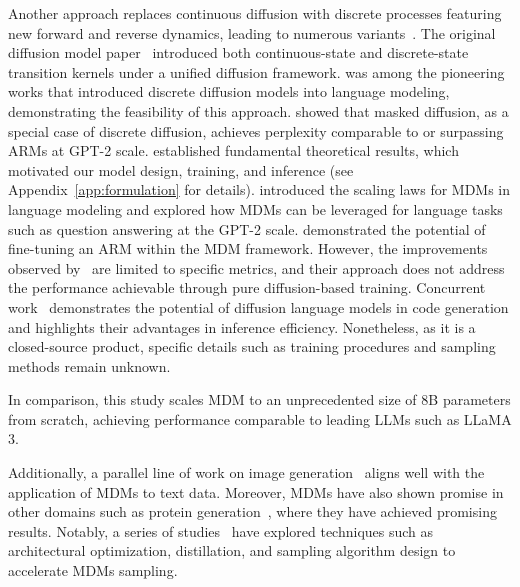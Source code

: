 \documentclass{article}
\begin{document}
Another approach replaces continuous diffusion with discrete processes featuring new forward and reverse dynamics, leading to numerous variants~\citep{hoogeboom2021argmax,hoogeboom2021autoregressive,he2022diffusionbert,campbell2022continuous,meng2022concrete,reid2022diffuser,sun2022score,kitouni2023disk,Zheng2023ARD,chen2023fast,ye2023diffusion,gat2024discrete,zheng2024maskeddiffusionmodelssecretly, kapur2024diffusion}. The original diffusion model paper~\citep{sohl2015deep} introduced both continuous-state and discrete-state transition kernels under a unified diffusion framework. \citet{austin2021structured} was among the pioneering works that introduced discrete diffusion models into language modeling, demonstrating the feasibility of this approach. \citet{lou2023discrete} showed that masked diffusion, as a special case of discrete diffusion, achieves perplexity comparable to or surpassing ARMs at GPT-2 scale. \citet{shi2024simplified, sahoo2024simple, ou2024your} established fundamental theoretical results, which motivated our model design, training, and inference (see Appendix~\ref{app:formulation} for details).  \citet{nie2024scaling} introduced the scaling laws for MDMs in language modeling and explored how MDMs can be leveraged for language tasks such as question answering at the GPT-2 scale. \citet{gong2024scaling} demonstrated the potential of fine-tuning an ARM within the MDM framework. However, the improvements observed by~\citet{gong2024scaling} are limited to specific metrics, and their approach does not address the performance achievable through pure diffusion-based training. Concurrent work~\citep{khanna2025mercury} demonstrates the potential of diffusion language models in code generation and highlights their advantages in inference efficiency. Nonetheless, as it is a closed-source product, specific details such as training procedures and sampling methods remain unknown.

In comparison, this study scales MDM to an unprecedented size of 8B parameters from scratch, achieving performance comparable to leading LLMs such as LLaMA 3.

Additionally, a parallel line of work on image generation~\citep{chang2022maskgit, chang2023muse, you2025effective} aligns well with the application of MDMs to text data. Moreover, MDMs have also shown promise in other domains such as protein generation~\citep{wang2024diffusion, wang2024dplm}, where they have achieved promising results. Notably, a series of studies~\citep{arriola2025block, kou2024cllms, xu2025show, liu2024think, zhu2025di, ren2025fast, hayakawa2024distillation, zhao2024informed, zheng2024masked, park2024jump, deschenaux2024beyond} have explored techniques such as architectural optimization, distillation, and sampling algorithm design to accelerate MDMs sampling.
\end{document}
